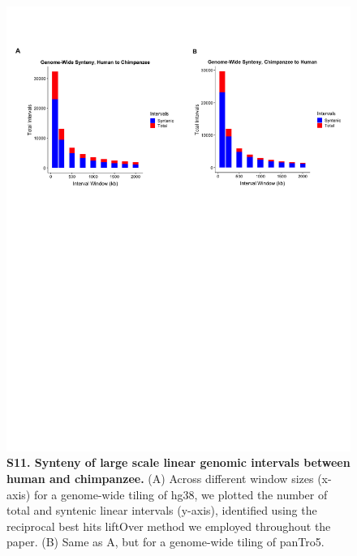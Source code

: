 \begin{figure}[!htb]
\centering
\includegraphics[width=6in]{img/figS11.pdf}
\caption[Synteny of large scale linear genomic intervals between human and chimpanzee.]{\textbf{S11. Synteny of large scale linear genomic intervals between human and chimpanzee.} (A) Across different window sizes (x-axis) for a genome-wide tiling of hg38, we plotted the number of total and syntenic linear intervals (y-axis), identified using the reciprocal best hits liftOver method \cite{Ward.2014, Kent.2002} we employed throughout the paper. (B) Same as A, but for a genome-wide tiling of panTro5.}
\label{fig:ch02-figS11}
\end{figure}

